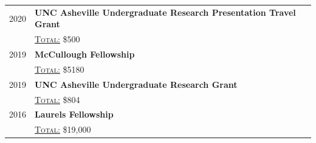 \begin{longtable}{r|p{15.6cm}}
    \small{2020} & \textbf{UNC Asheville Undergraduate Research Presentation Travel Grant}\\
    & \textsc{\underline{Total:}} \$500 \\ %
    
    \small{2019} & \textbf{McCullough Fellowship}\\
    & \textsc{\underline{Total:}} \$5180\\

    \small{2019} & \textbf{UNC Asheville Undergraduate Research Grant} \\
    & \textsc{\underline{Total:}} \$804\\ %

    \small{2016} & \textbf{Laurels Fellowship} \\
    & \textsc{\underline{Total:}} \$19,000 \\ %

\end{longtable}